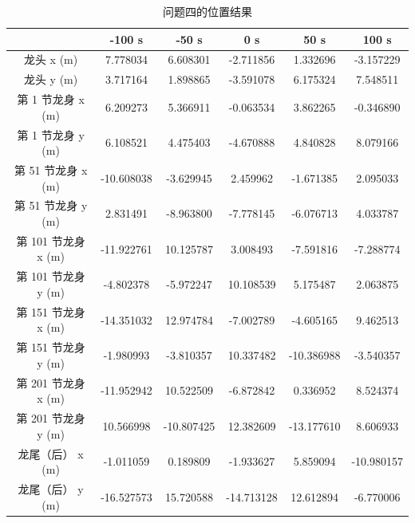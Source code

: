 \documentclass[a4paper]{article}
\begin{document}
		\begin{table}[H] %
			\captionsetup{skip=4pt} %
			\caption{问题四的位置结果}
			\centering
			\setlength{\arrayrulewidth}{0.5pt} %
			\begin{tabular}{|c|c|c|c|c|c|} %
				\hline
				& -100 s & -50 s & 0 s & 50 s & 100 s \\ \hline
				龙头 x (m)          & 7.778034 & 6.608301 & -2.711856 & 1.332696 & -3.157229 \\ \hline
				龙头 y (m)          & 3.717164 & 1.898865 & -3.591078 & 6.175324 & 7.548511 \\ \hline
				第 1 节龙身 x (m)   & 6.209273 & 5.366911 & -0.063534 & 3.862265 & -0.346890 \\ \hline
				第 1 节龙身 y (m)   & 6.108521 & 4.475403 & -4.670888 & 4.840828 & 8.079166 \\ \hline
				第 51 节龙身 x (m)  & -10.608038 & -3.629945 & 2.459962 & -1.671385 & 2.095033 \\ \hline
				第 51 节龙身 y (m)  & 2.831491 & -8.963800 & -7.778145 & -6.076713 & 4.033787 \\ \hline
				第 101 节龙身 x (m) & -11.922761 & 10.125787 & 3.008493 & -7.591816 & -7.288774 \\ \hline
				第 101 节龙身 y (m) & -4.802378 & -5.972247 & 10.108539 & 5.175487 & 2.063875 \\ \hline
				第 151 节龙身 x (m) & -14.351032 & 12.974784 & -7.002789 & -4.605165 & 9.462513 \\ \hline
				第 151 节龙身 y (m) & -1.980993 & -3.810357 & 10.337482 & -10.386988 & -3.540357 \\ \hline
				第 201 节龙身 x (m) & -11.952942 & 10.522509 & -6.872842 & 0.336952 & 8.524374 \\ \hline
				第 201 节龙身 y (m) & 10.566998 & -10.807425 & 12.382609 & -13.177610 & 8.606933 \\ \hline
				龙尾（后） x (m)    & -1.011059 & 0.189809 & -1.933627 & 5.859094 & -10.980157 \\ \hline
				龙尾（后） y (m)    & -16.527573 & 15.720588 & -14.713128 & 12.612894 & -6.770006 \\ \hline
			\end{tabular}
		\end{table}
	
\end{document}
